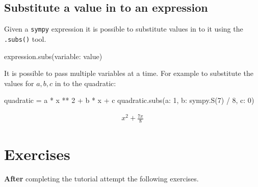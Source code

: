 \subsection{Substitute a value in to an expression}
\label{sec:substite_a_value_in_to_an_expression}

Given a \texttt{sympy} expression it is possible to substitute values in to it using
the \texttt{.subs()} tool.

\begin{api}
expression.subs({variable: value})
\end{api}

It is possible to pass multiple variables at a time.
For example to substitute the values for \(a, b, c\) in to the quadratic:

\begin{pyin}
quadratic = a * x ** 2 + b * x + c
quadratic.subs({a: 1, b: sympy.S(7) / 8, c: 0})
\end{pyin}

\begin{equation*}
\begin{split}\displaystyle x^{2} + \frac{7 x}{8}\end{split}
\end{equation*}

\section{Exercises}

\textbf{After} completing the tutorial attempt the following exercises.


